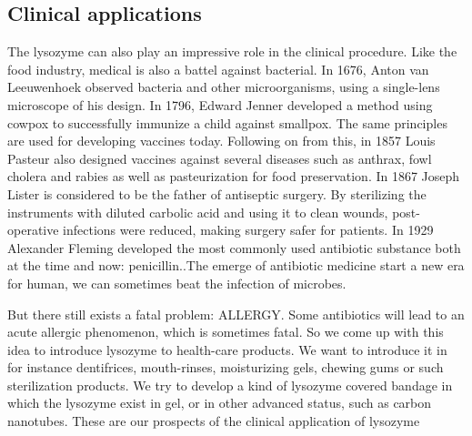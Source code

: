 \documentclass[a4paper,10pt]{article}
\begin{document}
    \subsection{Clinical applications}
    The lysozyme can also play an impressive role in the clinical procedure. Like the food industry, medical is also a battel against bacterial. In 1676, Anton van Leeuwenhoek observed bacteria and other microorganisms, using a single-lens microscope of his design.
    In 1796, Edward Jenner developed a method using cowpox to successfully immunize a child against smallpox. The same principles are used for developing vaccines today.
    Following on from this, in 1857 Louis Pasteur also designed vaccines against several diseases such as anthrax, fowl cholera and rabies as well as pasteurization for food preservation.
    In 1867 Joseph Lister is considered to be the father of antiseptic surgery. By sterilizing the instruments with diluted carbolic acid and using it to clean wounds, post-operative infections were reduced, making surgery safer for patients.
    In 1929 Alexander Fleming developed the most commonly used antibiotic substance both at the time and now: penicillin.\citep{Brock2003}.The emerge of antibiotic medicine start a new era for human, we can sometimes beat the infection of microbes.

    But there still exists a fatal problem: ALLERGY. Some antibiotics will lead to an acute allergic phenomenon, which is sometimes fatal. So we come up with this idea to introduce lysozyme to health-care products. We want to introduce it in for instance dentifrices, mouth-rinses, moisturizing gels, chewing gums or such sterilization products.\citep{Tenovuo2002}
    We try to develop a kind of lysozyme covered bandage in which the lysozyme exist in gel, or in other advanced status, such as carbon nanotubes.
    These are our prospects of the clinical application of lysozyme
    \printbibliography[title={Reference}] 
\end{document}
